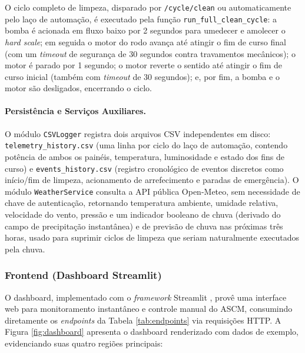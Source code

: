 \documentclass[12pt, a4paper]{article}
\begin{document}
O ciclo completo de limpeza, disparado por \texttt{/cycle/clean} ou automaticamente pelo laço de automação, é executado pela função \texttt{run\_full\_clean\_cycle}: a bomba é acionada em fluxo baixo por 2 segundos para umedecer e amolecer o \textit{hard scale}; em seguida o motor do rodo avança até atingir o fim de curso final (com um \textit{timeout} de segurança de 30 segundos contra travamentos mecânicos); o motor é parado por 1 segundo; o motor reverte o sentido até atingir o fim de curso inicial (também com \textit{timeout} de 30 segundos); e, por fim, a bomba e o motor são desligados, encerrando o ciclo.

\paragraph{Persistência e Serviços Auxiliares.} O módulo \texttt{CSVLogger} registra dois arquivos CSV independentes em disco: \texttt{telemetry\_history.csv} (uma linha por ciclo do laço de automação, contendo potência de ambos os painéis, temperatura, luminosidade e estado dos fins de curso) e \texttt{events\_history.csv} (registro cronológico de eventos discretos como início/fim de limpeza, acionamento de arrefecimento e paradas de emergência). O módulo \texttt{WeatherService} consulta a API pública Open-Meteo, sem necessidade de chave de autenticação, retornando temperatura ambiente, umidade relativa, velocidade do vento, pressão e um indicador booleano de chuva (derivado do campo de precipitação instantânea) e de previsão de chuva nas próximas três horas, usado para suprimir ciclos de limpeza que seriam naturalmente executados pela chuva.

\subsubsection{Frontend (Dashboard Streamlit)}

O dashboard, implementado com o \textit{framework} Streamlit \cite{streamlit_doc}, provê uma interface web para monitoramento instantâneo e controle manual do ASCM, consumindo diretamente os \textit{endpoints} da Tabela \ref{tab:endpoints} via requisições HTTP. A Figura \ref{fig:dashboard} apresenta o dashboard renderizado com dados de exemplo, evidenciando suas quatro regiões principais:
\end{document}
